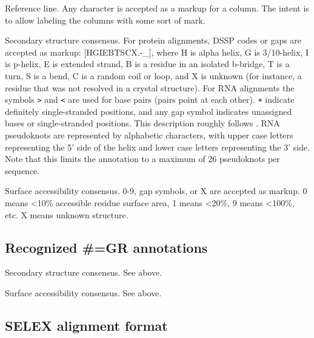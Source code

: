 \begin{wideitem}
\item [\emprog{RF}]
        Reference line. Any character is accepted as a markup for a
        column. The intent is to allow labeling the columns with some
        sort of mark.
        
\item [\emprog{SS\_cons}]
        Secondary structure consensus. For protein alignments,
        DSSP codes or gaps are accepted as markup: [HGIEBTSCX.-\_], where
        H is alpha helix, G is 3/10-helix, I is p-helix, E is extended
        strand, B is a residue in an isolated b-bridge, T is a turn, 
        S is a bend, C is a random coil or loop, and X is unknown
        (for instance, a residue that was not resolved in a crystal
        structure). For RNA alignments
        the symbols \verb+>+ and \verb+<+ are
        used for base pairs (pairs point at each other).  \verb-+- indicate
        definitely single-stranded positions, and any gap symbol indicates
        unassigned bases or single-stranded positions.  This description
        roughly follows \cite{Konings89}. 
        RNA pseudoknots are represented by alphabetic characters, with upper
        case letters representing the 5' side of the helix and lower case
        letters representing the 3' side. Note that this limits the
        annotation to a maximum of 26 pseudoknots per sequence.
        

\item [\emprog{SA\_cons}]
        Surface accessibility consensus. 0-9, gap symbols, or X are
        accepted as markup. 0 means <10\% accessible residue surface
        area, 1 means <20\%, 9 means <100\%, etc. X means unknown
        structure.
\end{wideitem}

\subsection{Recognized \#=GR annotations}
\begin{wideitem}
\item [\emprog{SS}]
        Secondary structure consensus. See  above.
\item [\emprog{SA}]
        Surface accessibility consensus. See  above.
\end{wideitem}


\subsection{SELEX alignment format}


